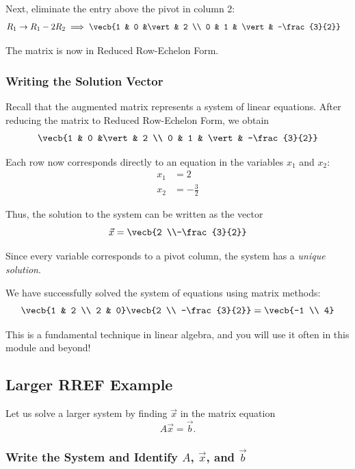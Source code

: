 Next, eliminate the entry above the pivot in column 2:
\begin{align*}
R_1 \rightarrow R_1 - 2R_2 
&\implies 
\vecb{1 & 0 &\vert & 2 \\ 0 & 1 & \vert & -\frac{3}{2}}
\end{align*}

The matrix is now in Reduced Row-Echelon Form.

\subsubsection{Writing the Solution Vector}

Recall that the augmented matrix represents a system of linear equations. After reducing the matrix to Reduced Row-Echelon Form, we obtain
\begin{align*}
\vecb{1 & 0 &\vert & 2 \\ 0 & 1 & \vert & -\frac{3}{2}}
\end{align*}

Each row now corresponds directly to an equation in the variables $x_1$ and $x_2$:
\begin{align*}
x_1 &= 2 \\
x_2 &= -\frac{3}{2}
\end{align*}

Thus, the solution to the system can be written as the vector
\[
\vec{x}
=
\vecb{2 \\-\frac{3}{2}}
\]

Since every variable corresponds to a pivot column, the system has a \emph{unique solution}.

We have successfully solved the system of equations using matrix methods:
$$\vecb{1 & 2 \\ 2 & 0}\vecb{2 \\ -\frac{3}{2}} = \vecb{-1 \\ 4}$$

This is a fundamental technique in linear algebra, and you will use it often in this module and beyond!

\subsection{Larger RREF Example}

Let us solve a larger system by finding $\vec{x}$ in the matrix equation
\[
A\vec{x}=\vec{b}.
\]

\subsubsection{Write the System and Identify $A$, $\vec{x}$, and $\vec{b}$}

